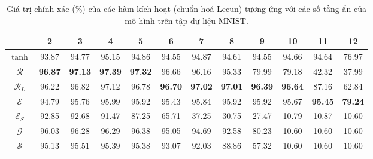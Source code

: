 \begin{table}[ht!]
\centering
\def\arraystretch{1.1}
\begin{tabular}{c|c|c|c|c|c|c|c|c|c|c|c|}
\cline{2-12}
& 2     & 3     & 4     & 5     & 6     & 7     & 8     & 9     & 10    & 11    & 12    \\ \hline
\multicolumn{1}{|c|}{$\tanh$} & 93.87 & 94.77 & 95.15 & 94.86 & 94.55 & 94.87 & 94.61 & 94.55 & 94.66 & 94.64 & 76.97 \\ \hline
\multicolumn{1}{|c|}{$\mathcal{R}$} & \textbf{96.87} & \textbf{97.13} & \textbf{97.39} & \textbf{97.32} & 96.66 & 96.16 & 95.33 & 79.99 & 79.18 & 42.32 & 37.99 \\ \hline
\multicolumn{1}{|c|}{$\mathcal{R}_L$} & 96.22 & 96.82 & 97.12 & 96.78 & \textbf{96.70} & \textbf{97.02} & \textbf{97.01} & \textbf{96.39} & \textbf{96.64} & 87.16 & 62.84 \\ \hline
\multicolumn{1}{|c|}{$\mathcal{E}$} & 94.79 & 95.76 & 95.99 & 95.92 & 95.43 & 95.84 & 95.92 & 95.92 & 95.67 & \textbf{95.45} & \textbf{79.24} \\ \hline
\multicolumn{1}{|c|}{$\mathcal{E}_S$} & 92.85 & 92.68 & 91.47 & 87.25 & 65.71 & 37.25 & 30.75 & 27.47 & 10.79 & 10.87 & 10.60 \\ \hline
\multicolumn{1}{|c|}{$\mathcal{G}$} & 96.03 & 96.28 & 96.29 & 96.38 & 95.05 & 94.69 & 92.58 & 80.23 & 10.60 & 10.60 & 10.60 \\ \hline
\multicolumn{1}{|c|}{$\mathcal{S}$} & 95.13 & 95.51 & 95.39 & 95.38 & 93.07 & 92.03 & 88.86 & 57.32 & 10.60 & 10.60 & 10.60 \\ \hline
\end{tabular}
\caption{Giá trị chính xác (\%) của các hàm kích hoạt (chuẩn hoá Lecun) tương ứng với các số tầng ẩn của mô hình trên tập dữ liệu MNIST.}
\label{tab:mnistdacc}
\end{table}

